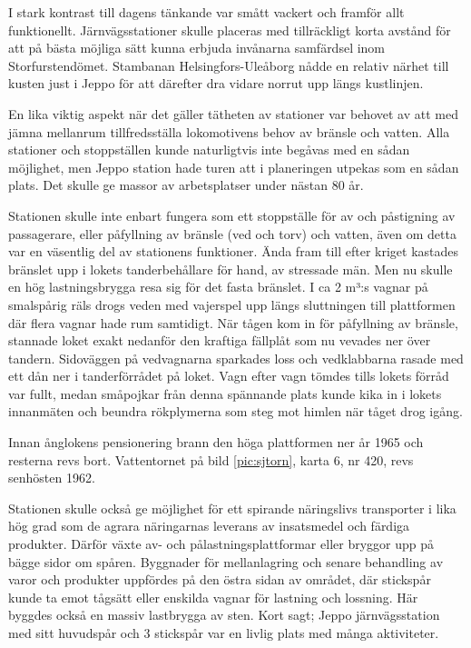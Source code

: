 I stark kontrast till dagens tänkande var smått vackert och framför allt funktionellt. Järnvägsstationer skulle placeras med tillräckligt korta avstånd för att på bästa möjliga sätt kunna erbjuda invånarna samfärdsel inom Storfurstendömet. Stambanan Helsingfors-Uleåborg nådde en relativ närhet till kusten just i Jeppo för att därefter dra vidare norrut upp längs kustlinjen.

En lika viktig aspekt när det gäller tätheten av stationer var behovet av att med jämna mellanrum tillfredsställa lokomotivens behov av bränsle och vatten. Alla stationer och stoppställen kunde naturligtvis inte begåvas med en sådan möjlighet, men Jeppo station hade turen att i planeringen utpekas som en sådan plats. Det skulle ge massor av arbetsplatser under nästan 80 år.

Stationen skulle inte enbart fungera som ett stoppställe för av och påstigning av passagerare, eller påfyllning av bränsle (ved och torv) och vatten, även om detta var en väsentlig del av stationens funktioner. Ända fram till efter kriget kastades bränslet upp i lokets tanderbehållare för hand, av stressade män. Men nu skulle en hög lastningsbrygga resa sig för det fasta bränslet. I ca 2 m³:s vagnar på smalspårig räls drogs veden med vajerspel upp längs sluttningen till plattformen där flera vagnar hade rum samtidigt. När tågen kom in för påfyllning av bränsle, stannade loket exakt nedanför den kraftiga fällplåt som nu vevades ner över tandern. Sidoväggen på vedvagnarna sparkades loss och vedklabbarna rasade med ett dån ner i tanderförrådet på loket. Vagn efter vagn tömdes tills lokets förråd var fullt, medan småpojkar från denna spännande plats kunde kika in i lokets innanmäten och beundra rökplymerna som steg mot himlen när tåget drog igång.

Innan  ånglokens pensionering brann den höga plattformen ner år 1965 och resterna revs bort. Vattentornet på bild \ref{pic:sjtorn}, karta 6, nr 420, revs senhösten 1962.

Stationen skulle också ge möjlighet för ett spirande näringslivs transporter i lika hög grad som de agrara näringarnas leverans av insatsmedel och färdiga produkter. Därför växte av- och pålastningsplattformar eller bryggor upp på bägge sidor om spåren. Byggnader för mellanlagring och senare behandling av varor och produkter uppfördes på den östra sidan av området, där stickspår kunde ta emot tågsätt eller enskilda vagnar för lastning och lossning. Här byggdes också en massiv lastbrygga av sten. Kort sagt; Jeppo järnvägsstation med sitt huvudspår och 3 stickspår var en livlig plats med många aktiviteter.

